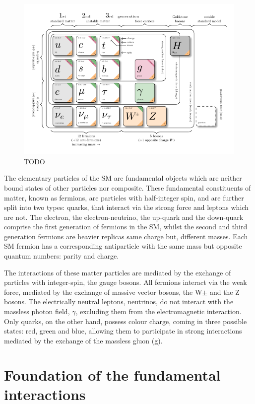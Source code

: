 \begin{figure}
\centering
\includegraphics[width= 1\textwidth]{Figures/Introduction/Particles.pdf}
\caption{TODO}\label{Figure:Introduction_1}
\end{figure}

The elementary particles of the SM are fundamental objects which are neither bound states of other particles nor composite. These fundamental constituents of matter, known as fermions, are particles with half-integer spin, and are further split into two types: quarks, that interact via the strong force and leptons which are not.  The electron, the electron-neutrino, the up-quark and the down-quark comprise the first generation of fermions in the SM, whilst the second and third generation fermions are heavier replicas \ie same charge but, different masses. Each SM fermion has a corresponding antiparticle with the same mass but opposite quantum numbers: parity and charge.

The interactions of these matter particles are mediated by the exchange of particles with integer-spin, the gauge bosons. All fermions interact via the weak force, mediated by the exchange of massive vector bosons, the W$\pm$ and the Z bosons. The electrically neutral leptons, neutrinos, do not interact with the massless photon field, $\gamma$, excluding them from the electromagnetic interaction. Only quarks, on the other hand, possess colour charge, coming in three possible states: red, green and blue, allowing them to participate in strong interactions mediated by the exchange of the massless gluon (g). 

\section{Foundation of the fundamental interactions}


